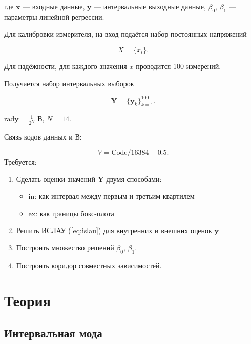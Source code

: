 \documentclass{article}
\begin{document}
  где \( \mathbf{x} \) --- входные данные, \( \mathbf{y} \) --- интервальные
  выходные данные, \( \beta_0 \), \( \beta_1 \) --- параметры линейной
  регрессии.

  Для калибровки измерителя, на вход подаётся набор постоянных
  напряжений

  \begin{equation}
    X = \{ x_i \}.
  \end{equation}

  Для надёжности, для каждого значения \( x \) проводится 100 измерений.

  Получается набор интервальных выборок

  \begin{equation}
    \mathbf{Y} = \{ \mathbf{y}_k \}_{k=1}^{100}.
  \end{equation}

  \( \text{rad} \mathbf{y} = \frac{1}{2^N} \) В, \( N = 14 \).

  Связь кодов данных и В:

  \begin{equation}
    V = \text{Code} / 16384 - 0.5.
  \end{equation}
  Требуется:
  \begin{enumerate}
    \item   Сделать оценки значений \( \mathbf{Y} \) двумя способами:

    \begin{itemize}
      \item in: как интервал между первым и третьим квартилем
      \item ex: как границы бокс-плота
    \end{itemize}
  
    \item Решить ИСЛАУ (\ref{eq:islau}) для внутренних и внешних оценок
    \( \mathbf{y} \)
  
    \item Построить множество решений \( \beta_0 \), \( \beta_1 \).
  
    \item Построить коридор совместных зависимостей.
  \end{enumerate}
  \section{Теория}

  \subsection{Интервальная мода}
\end{document}
